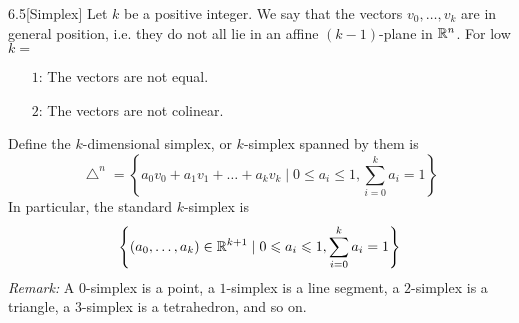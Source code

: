 \begin{customdefinition}{6.5}[Simplex] 
Let $k$ be a positive integer. We say that the vectors $v_0, \dots, v_k$ are in general position, i.e. they do not all lie in an affine $(k -1)$-plane in $\mathbb{R}^n$. For low $k = $
    \begin{enumerate}
        \item[$1$:] The vectors are not equal.
        \item[$2$:] The vectors are not colinear.
    \end{enumerate}
Define the $k$-dimensional simplex, or $k$-simplex spanned by them is 
$$\bigtriangleup^n = \left\{a_0v_0 + a_1v_1 + \dots + a_kv_k \mid 0 \leqslant a_i \leqslant 1, \sum_{i = 0}^{k}a_i = 1\right\}$$
In particular, the standard $k$-simplex is
$$\left\{\left(a_0, \dots, a_k\right) \in \mathbb{R}^{k+1} \mid 0 \leqslant a_i \leqslant 1, \sum_{i = 0}^{k}a_i = 1\right\}$$
\emph{Remark:} A $0$-simplex is a point, a $1$-simplex is a line segment, a $2$-simplex is a triangle, a $3$-simplex is a tetrahedron, and so on.
\end{customdefinition}

